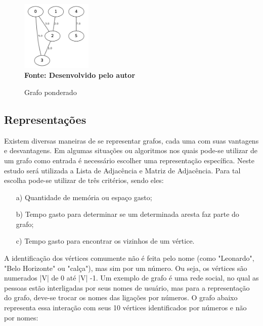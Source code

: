 \begin{figure}[ht]
	\centering	
	\caption[\hspace{0.1cm}Grafo ponderado.]{Grafo ponderado}
	\vspace{-0.4cm}
	\includegraphics[width=0.3\textwidth]{figuras/grafo-ponderado.png}
	 \vspace{-0.2cm}
	\\\textbf{\footnotesize Fonte: Desenvolvido pelo autor}
	\label{fig:figura1}
\end{figure}

\subsection{\esp Representações}

Existem diversas maneiras de se representar grafos, cada uma com suas vantagens e desvantagens. Em algumas situações ou algoritmos nos quais pode-se utilizar de um grafo como entrada é necessário escolher uma representação específica. Neste estudo será utilizada a Lista de Adjacência e Matriz de Adjacência.
Para tal escolha pode-se utilizar de três critérios, sendo eles:

\begin{enumerate} 
 \item [a)] Quantidade de memória ou espaço gasto;
 \item [b)] Tempo gasto para determinar se um determinada aresta faz parte do grafo;
 \item [c)] Tempo gasto para encontrar os vizinhos de um vértice.
\end{enumerate}

A identificação dos vértices comumente não é feita pelo nome (como "Leonardo", "Belo Horizonte" ou "calça"), mas sim por um número. Ou seja, os vértices são numerados |V| de 0 até |V| -1. Um exemplo de grafo é uma rede social, no qual as pessoas estão interligadas por seus nomes de usuário, mas para a representação do grafo, deve-se trocar os nomes das ligações por números. O grafo abaixo representa essa interação com seus 10 vértices identificados por números e não por nomes:

